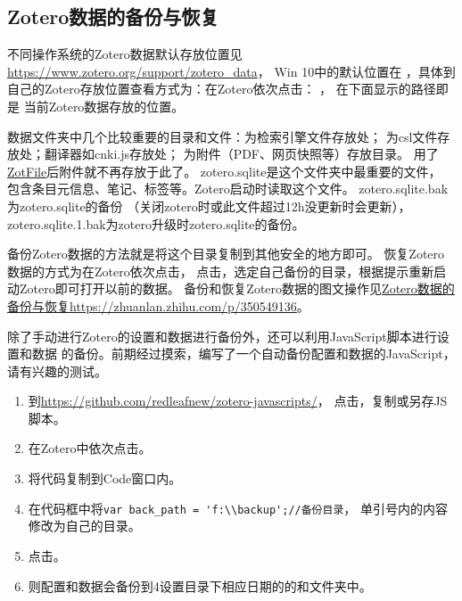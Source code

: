 \documentclass[cn,11pt,chinese]{elegantbook}
\begin{document}
		\subsection{Zotero数据的备份与恢复} \label{sec:data_dir}
					不同操作系统的Zotero数据默认存放位置见\url{https://www.zotero.org/support/zotero_data}，
					Win 10中的默认位置在
					，具体到自己的Zotero存放位置查看方式为：在Zotero依次点击：
					，
					在下面显示的路径即是
					当前Zotero数据存放的位置。
					
					数据文件夹中几个比较重要的目录和文件：为检索引擎文件存放处；
					为csl文件存放处；翻译器如cnki.js存放处；
					为附件（PDF、网页快照等）存放目录。
					用了\href{http://zotfile.com/}{ZotFile}后附件就不再存放于此了。
					zotero.sqlite是这个文件夹中最重要的文件，
					包含条目元信息、笔记、标签等。Zotero启动时读取这个文件。
					zotero.sqlite.bak为zotero.sqlite的备份
					（关闭zotero时或此文件超过12h没更新时会更新），
					zotero.sqlite.1.bak为zotero升级时zotero.sqlite的备份。
		
					备份Zotero数据的方法就是将这个目录复制到其他安全的地方即可。
					恢复Zotero数据的方式为在Zotero依次点击，
					点击，选定自己备份的目录，根据提示重新启动Zotero即可打开以前的数据。
					备份和恢复Zotero数据的图文操作见\href{https://zhuanlan.zhihu.com/p/350549136}
					{Zotero数据的备份与恢复https://zhuanlan.zhihu.com/p/350549136}。

					除了手动进行Zotero的设置和数据进行备份外，还可以利用JavaScript脚本进行设置和数据
					的备份。前期经过摸索，编写了一个自动备份配置和数据的JavaScript，请有兴趣的测试。
					\begin{enumerate}
						\item 到\href{https://github.com/redleafnew/zotero-javascripts/blob/main/8back%20up%20profile%20and%20data.js}
						{https://github.com/redleafnew/zotero-javascripts/}，
						点击，复制或另存JS脚本。
						\item 在Zotero中依次点击。
						\item 将代码复制到Code窗口内。
						\item 在代码框中将\verb|var back_path = 'f:\\backup';//备份目录|，
						单引号内的内容修改为自己的目录。
						\item 点击。
						\item 则配置和数据会备份到4设置目录下相应日期的的和文件夹中。
					\end{enumerate}
					
\end{document}
